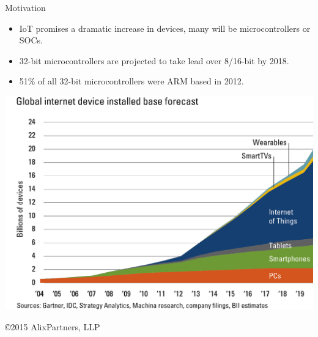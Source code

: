 \documentclass[xcolor=pdftex,dvipsnames,table,final]{beamer}
\begin{document}
\begin{frame}[fragile]{}
\begin{columns}[t, totalwidth=\textwidth]
\begin{column}{.31\linewidth}
      \begin{block}{Motivation}
        \begin{itemize}
          \vspace{-1ex}\small
          \item IoT promises a dramatic increase in devices, many will be microcontrollers or SOCs.
          \item 32-bit microcontrollers are projected to take lead over 8/16-bit by 2018.
          \item 51\% of all 32-bit microcontrollers were ARM based in 2012.
        \end{itemize}
        \begin{center}
          \includegraphics[scale=1.0]{figures/IMS-Internet_of_things.png}
      
          \vspace{-1ex}
          {\tiny \copyright 2015 AlixPartners, LLP}
        \end{center}
      \end{block}
	 

\end{column}
\end{columns}
\end{frame}
\end{document}
